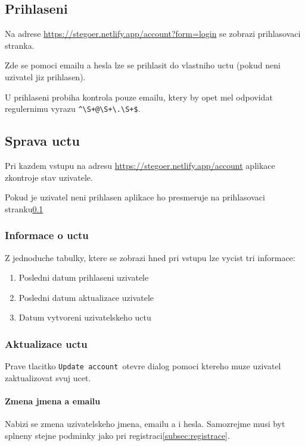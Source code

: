 \subsection{Prihlaseni}\label{subsec:prihlaseni}
Na adrese \url{https://stegoer.netlify.app/account?form=login} se zobrazi
prihlasovaci stranka.

Zde se pomoci emailu a hesla lze se prihlasit do vlastniho uctu (pokud neni
uzivatel jiz prihlasen).

U prihlaseni probiha kontrola pouze emailu, ktery by opet mel odpovidat
regulernimu vyrazu \verb/^\S+@\S+\.\S+$/.

\subsection{Sprava uctu}\label{subsec:sprava-uctu}
Pri kazdem vstupu na adresu \url{https://stegoer.netlify.app/account} aplikace
zkontroje stav uzivatele.

Pokud je uzivatel neni prihlasen aplikace ho presmeruje na prihlasovaci
stranku\ref{subsec:prihlaseni}

\subsubsection{Informace o uctu}

Z jednoduche tabulky, ktere se zobrazi hned pri vstupu lze vycist tri informace:

\begin{enumerate}
    \item Posledni datum prihlaseni uzivatele
    \item Posledni datum aktualizace uzivatele
    \item Datum vytvoreni uzivatelskeho uctu
\end{enumerate}

\subsubsection{Aktualizace uctu}

Prave tlacitko \texttt{Update account }otevre dialog pomoci ktereho muze
uzivatel zaktualizovat svuj ucet.

\paragraph{Zmena jmena a emailu}

Nabizi se zmena uzivatelskeho jmena, emailu a i hesla.
Samozrejme musi byt splneny stejne podminky jako pri registraci\ref{subsec:registrace}.

